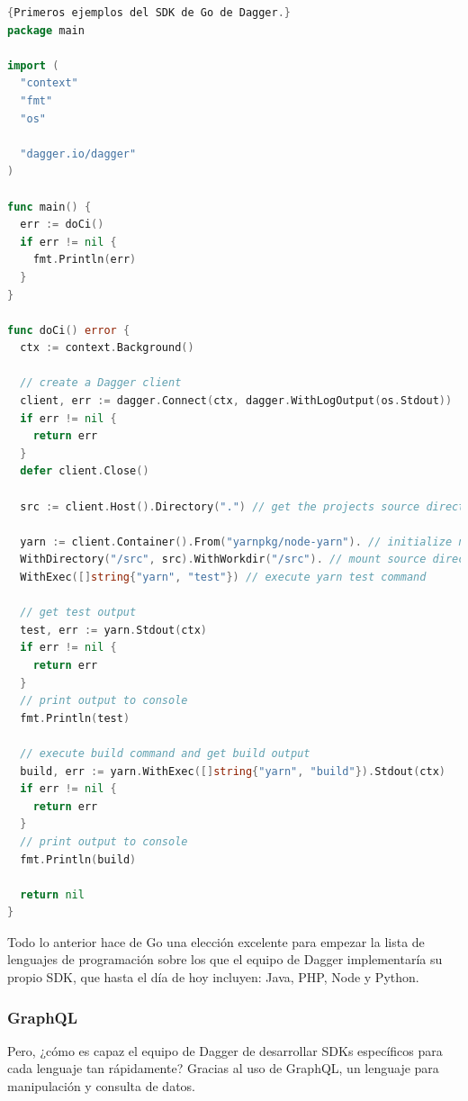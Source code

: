 \begin{lstlisting}[language=go,label=lst:daggergo]{Primeros ejemplos del SDK de Go de Dagger.}
package main

import (
  "context"
  "fmt"
  "os"

  "dagger.io/dagger"
)

func main() {
  err := doCi()
  if err != nil {
    fmt.Println(err)
  }
}

func doCi() error {
  ctx := context.Background()

  // create a Dagger client
  client, err := dagger.Connect(ctx, dagger.WithLogOutput(os.Stdout))
  if err != nil {
    return err
  }
  defer client.Close()

  src := client.Host().Directory(".") // get the projects source directory

  yarn := client.Container().From("yarnpkg/node-yarn"). // initialize new container from yarn image
  WithDirectory("/src", src).WithWorkdir("/src"). // mount source directory to /src
  WithExec([]string{"yarn", "test"}) // execute yarn test command

  // get test output
  test, err := yarn.Stdout(ctx)
  if err != nil {
    return err
  }
  // print output to console
  fmt.Println(test)

  // execute build command and get build output
  build, err := yarn.WithExec([]string{"yarn", "build"}).Stdout(ctx)
  if err != nil {
    return err
  }
  // print output to console
  fmt.Println(build)

  return nil
}
\end{lstlisting}

Todo lo anterior hace de Go una elección excelente para empezar la lista de lenguajes de programación sobre los que el equipo de Dagger implementaría su propio SDK, que hasta el día de hoy incluyen: Java, PHP, Node y Python. 

\subsubsection*{GraphQL}

Pero, ¿cómo es capaz el equipo de Dagger de desarrollar SDKs específicos para cada lenguaje tan rápidamente? Gracias al uso de GraphQL\cite{graphql}, un lenguaje para manipulación y consulta de datos.

